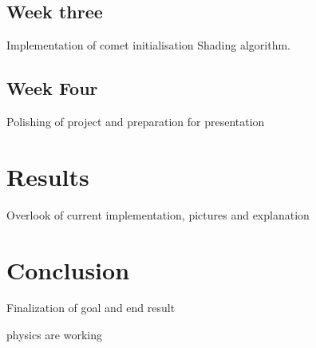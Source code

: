 \documentclass[a4paper,11pt]{article}
\begin{document}
\subsection{Week three}
Implementation of comet initialisation
Shading algorithm.

\subsection{Week Four}
Polishing of project and preparation for presentation
\section{Results}
Overlook of current implementation, pictures and explanation
\section{Conclusion}
Finalization of goal and end result

physics are working 
\end{document}
